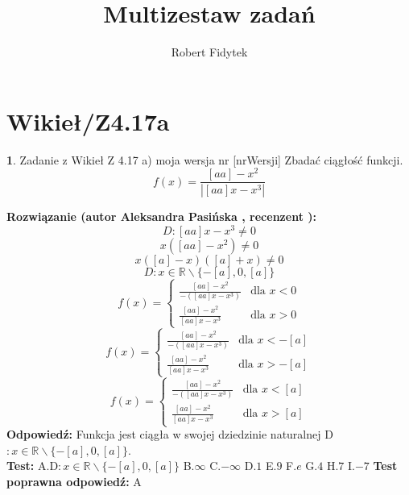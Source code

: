 \documentclass[12pt, a4paper]{article}
\title{Multizestaw zadań}
\author{Robert Fidytek}
\date{}
\theoremstyle{definition} %
\newtheorem{zad}{}
\newcommand{\kategoria}[1]{\section{#1}} %
\newcommand{\zadStart}[1]{\begin{zad}#1\newline} %
\newcommand{\zadStop}{\end{zad}}   %
\newcommand{\rozwStart}[2]{\noindent \textbf{Rozwiązanie (autor #1 , recenzent #2): }\newline} %
\newcommand{\rozwStop}{\newline}                                            %
\newcommand{\odpStart}{\noindent \textbf{Odpowiedź:}\newline}    %
\newcommand{\odpStop}{\newline}                                             %
\newcommand{\testStart}{\noindent \textbf{Test:}\newline} %
\newcommand{\testStop}{\newline} %
\newcommand{\kluczStart}{\noindent \textbf{Test poprawna odpowiedź:}\newline} %
\newcommand{\kluczStop}{\newline} %
\begin{document}
\maketitle


\kategoria{Wikieł/Z4.17a}
\zadStart{Zadanie z Wikieł Z 4.17 a) moja wersja nr [nrWersji]}
Zbadać ciągłość funkcji. $$f(x)=\frac{[aa]-x^2}{|[aa]x-x^3|}$$
\zadStop
\rozwStart{Aleksandra Pasińska}{}
$$D:[aa]x-x^3\neq 0$$
$$x([aa]-x^2)\neq0$$
$$x([a]-x)([a]+x)\neq0$$
$$D:x\in \mathbb{R}\backslash \{-[a],0,[a]\}$$
$$f(x)= \left\{ \begin{array}{ll}
\frac{[aa]-x^2}{-([aa]x-x^3)} & \textrm{dla $x<0$}\\
\frac{[aa]-x^2}{[aa]x-x^3} & \textrm{dla $x>0$} 
\end{array} \right.$$
$$f(x)= \left\{ \begin{array}{ll}
\frac{[aa]-x^2}{-([aa]x-x^3)} & \textrm{dla $x<-[a]$}\\
\frac{[aa]-x^2}{[aa]x-x^3} & \textrm{dla $x>-[a]$} 
\end{array} \right.$$
$$f(x)= \left\{ \begin{array}{ll}
\frac{[aa]-x^2}{-([aa]x-x^3)} & \textrm{dla $x<[a]$}\\
\frac{[aa]-x^2}{[aa]x-x^3} & \textrm{dla $x>[a]$} 
\end{array} \right.$$
\rozwStop
\odpStart
Funkcja jest ciągła w swojej dziedzinie naturalnej D$:x\in \mathbb{R}\backslash \{-[a],0,[a]\}$.\\
\odpStop
\testStart
A.D$:x\in \mathbb{R}\backslash \{-[a],0,[a]\}$
B.$\infty$
C.$-\infty$
D.$1$
E.$9$
F.$e$
G.$4$
H.$7$
I.$-7$
\testStop
\kluczStart
A
\kluczStop
\end{document}
